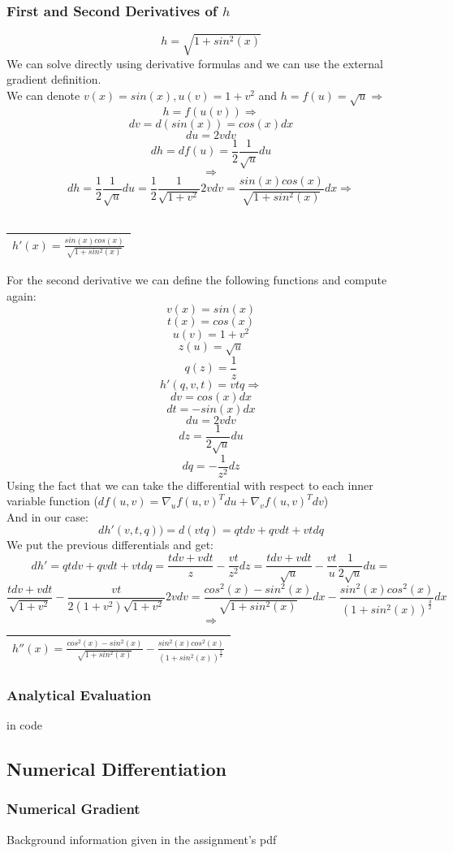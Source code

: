 \documentclass[12pt]{article}
\newcommand{\rectres}[1]{
\begin{center}
\begin{tabular}{ |c| }
\hline
 #1\\
\hline
\end{tabular}
\end{center}
}
\begin{document}
\subsubsection{First and Second Derivatives of $h$}
$$h=\sqrt{1+sin^2(x)}$$
We can solve directly using derivative formulas and we can use the external gradient definition.\\
We can denote $v(x)=sin(x),u(v)=1+v^2$ and $h = f(u)=\sqrt{u} \Rightarrow$ 
$$h=f(u(v)) \Rightarrow$$
$$dv=d(sin(x))=cos(x)dx$$
$$ du=2vdv$$
$$ dh=df(u)=\frac{1}{2}\frac{1}{\sqrt{u}}du$$
$$\Rightarrow$$
$$dh=\frac{1}{2}\frac{1}{\sqrt{u}}du=\frac{1}{2}\frac{1}{\sqrt{1+v^2}}2vdv=\frac{sin(x)cos(x)}{\sqrt{1+sin^2(x)}}dx \Rightarrow$$\\
\rectres{$h'(x)=\frac{sin(x)cos(x)}{\sqrt{1+sin^2(x)}}$}
For the second derivative we can define the following functions and compute again:\\ $$v(x)=sin(x)$$ 
$$t(x)=cos(x)$$
$$u(v)=1+v^2$$
$$z(u)=\sqrt{u}$$
$$q(z)=\frac{1}{z}$$
$$h'(q,v,t)=vtq\Rightarrow$$
$$dv=cos(x)dx$$
$$dt=-sin(x)dx$$
$$du=2vdv$$
$$dz=\frac{1}{2\sqrt{u}}du$$
$$dq=-\frac{1}{z^2}dz$$
Using the fact that we can take the differential with respect to each inner variable function ($df(u,v)=\nabla_u f(u,v)^Tdu + \nabla_v f(u,v)^Tdv$)\\
And in our case:
$$dh'(v,t,q))=d(vtq)=qtdv+qvdt+vtdq$$
We put the previous differentials and get:\\
$$dh'=qtdv+qvdt+vtdq=\frac{tdv+vdt}{z}-\frac{vt}{z^2}dz=\frac{tdv+vdt}{\sqrt{u}}-\frac{vt}{u}\frac{1}{2\sqrt{u}}du=$$
$$\frac{tdv+vdt}{\sqrt{1+v^2}}-\frac{vt}{2(1+v^2)\sqrt{1+v^2}}2vdv=\frac{cos^2(x)-sin^2(x)}{\sqrt{1+sin^2(x)}}dx-\frac{sin^2(x)cos^2(x)}{(1+sin^2(x))^{\frac{3}{2}}}dx$$
$$\Rightarrow$$
\rectres{$h''(x)=\frac{cos^2(x)-sin^2(x)}{\sqrt{1+sin^2(x)}}-\frac{sin^2(x)cos^2(x)}{(1+sin^2(x))^{\frac{3}{2}}}$}

\subsubsection{Analytical Evaluation}
in code

\subsection{Numerical Differentiation}
\subsubsection{Numerical Gradient}
Background information given in the assignment's pdf
\end{document}
